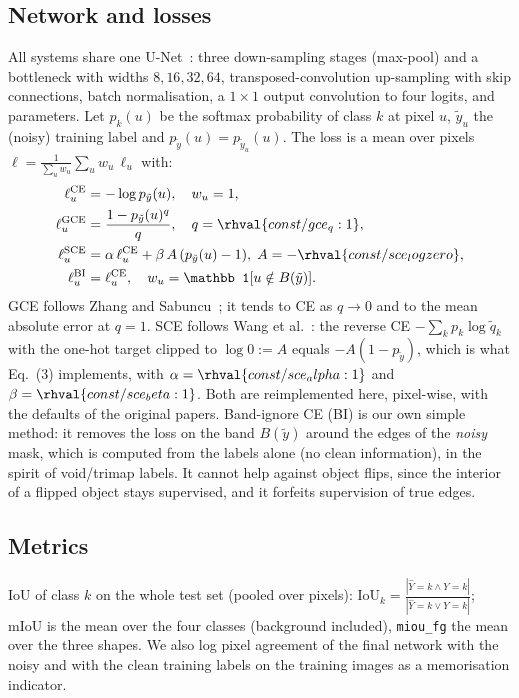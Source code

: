 \subsection{Network and losses}
All systems share one U-Net~\cite{ronneberger2015u}: three down-sampling stages (max-pool) and a bottleneck with widths $8,16,32,64$, transposed-convolution up-sampling with skip connections, batch normalisation, a $1\times1$ output convolution to four logits, and  parameters. Let $p_k(u)$ be the softmax probability of class $k$ at pixel $u$, $\tilde y_u$ the (noisy) training label and $p_{\tilde y}(u)=p_{\tilde y_u}(u)$. The loss is a mean over pixels $\ell=\frac{1}{\sum_u w_u}\sum_u w_u\,\ell_u$ with:
\begin{align}
\ell^{\mathrm{CE}}_u &= -\log p_{\tilde y}(u), \quad w_u=1,\\
\ell^{\mathrm{GCE}}_u &= \frac{1-p_{\tilde y}(u)^{q}}{q}, \quad q=\rhval{const/gce_q:1},\\
\ell^{\mathrm{SCE}}_u &= \alpha\,\ell^{\mathrm{CE}}_u+\beta\,A\,(p_{\tilde y}(u)-1),\; A=-\rhval{const/sce_logzero},\\
\ell^{\mathrm{BI}}_u &= \ell^{\mathrm{CE}}_u,\quad w_u=\mathbb 1[u\notin B(\tilde y)].
\end{align}
GCE follows Zhang and Sabuncu~\cite{zhang2018generalized}; it tends to CE as $q\to0$ and to the mean absolute error at $q=1$. SCE follows Wang et al.~\cite{wang2019symmetric}: the reverse CE $-\sum_k p_k\log \tilde q_k$ with the one-hot target clipped to $\log 0:=A$ equals $-A(1-p_{\tilde y})$, which is what Eq.~(3) implements, with $\alpha=\rhval{const/sce_alpha:1}$ and $\beta=\rhval{const/sce_beta:1}$. Both are reimplemented here, pixel-wise, with the defaults of the original papers. Band-ignore CE (BI) is our own simple method: it removes the loss on the band $B(\tilde y)$ around the edges of the \emph{noisy} mask, which is computed from the labels alone (no clean information), in the spirit of void/trimap labels. It cannot help against object flips, since the interior of a flipped object stays supervised, and it forfeits supervision of true edges.

\subsection{Metrics}
IoU of class $k$ on the whole test set (pooled over pixels): $\mathrm{IoU}_k=\frac{|\hat Y=k\wedge Y=k|}{|\hat Y=k\vee Y=k|}$; mIoU is the mean over the four classes (background included), \texttt{miou\_fg} the mean over the three shapes. We also log pixel agreement of the final network with the noisy and with the clean training labels on the training images as a memorisation indicator.

